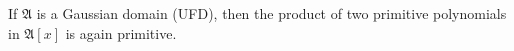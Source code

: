 If $\mathfrak{A}$ is a Gaussian domain (UFD), then the product of two primitive polynomials in $\mathfrak{A}[x]$ is again primitive.
